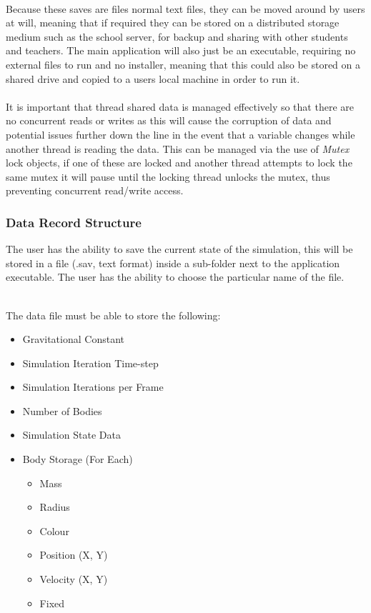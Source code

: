 \paragraph{}
Because these saves are files normal text files, they can be moved around by users at will, meaning that if required they can be stored on a distributed storage medium such as the school server, for backup and sharing with other students and teachers. The main application will also just be an executable, requiring no external files to run and no installer, meaning that this could also be stored on a shared drive and copied to a users local machine in order to run it.

\paragraph{}
It is important that thread shared data is managed effectively so that there are no concurrent reads or writes as this will cause the corruption of data and potential issues further down the line in the event that a variable changes while another thread is reading the data. This can be managed via the use of \textit{Mutex} lock objects, if one of these are locked and another thread attempts to lock the same mutex it will pause until the locking thread unlocks the mutex, thus preventing concurrent read/write access.

\subsubsection{Data Record Structure}
The user has the ability to save the current state of the simulation, this will be stored in a file (.sav, text format) inside a sub-folder next to the application executable. The user has the ability to choose the particular name of the file.\\\

The data file must be able to store the following:

\begin{itemize}
\item Gravitational Constant
\item Simulation Iteration Time-step
\item Simulation Iterations per Frame
\item Number of Bodies
\item Simulation State Data
\item Body Storage (For Each)
  \begin{itemize}
  \item Mass
  \item Radius
  \item Colour
  \item Position (X, Y)
  \item Velocity (X, Y)
  \item Fixed
  \end{itemize}
\end{itemize}

